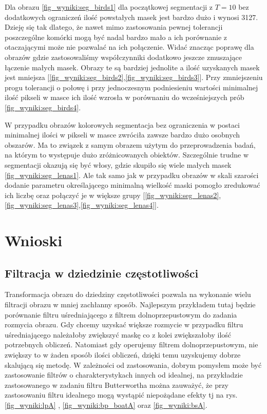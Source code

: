 \documentclass{classrep}
\begin{document}
Dla obrazu \ref{fig_wyniki:seg_birds1} dla początkowej segmentacji z $T=10$ bez dodatkowych ograniczeń ilość powstałych masek jest bardzo dużo i wynosi 3127. Dzieję się tak dlatego, że nawet mimo zastosowania pewnej tolerancji poszczególne komórki mogą być nadal bardzo mało a ich porównanie z otaczającymi może nie pozwalać na ich połączenie. Widać znacząc poprawę dla obrazów gdzie zastosowaliśmy współczynniki dodatkowo jeszcze zmuszające łączenie małych masek. Obrazy te są bardziej jednolite a ilość uzyskanych masek jest mniejsza [\ref{fig_wyniki:seg_birds2},\ref{fig_wyniki:seg_birds3}]. Przy zmniejszeniu progu tolerancji o połowę i przy jednoczesnym podniesieniu wartości minimalnej ilość pikseli w masce ich ilość wzrosła w porównaniu do wcześniejszych prób \ref{fig_wyniki:seg_birds4}.

W przypadku obrazów kolorowych segmentacja bez ograniczenia w postaci minimalnej ilości w pikseli w masce zwróciła zawsze bardzo dużo osobnych obszarów. Ma to związek z samym obrazem użytym do przeprowadzenia badań, na którym to występuje dużo zróżnicowanych obiektów. Szczególnie trudne w segmentacji okazują się być włosy, gdzie skupiło się wiele małych masek \ref{fig_wyniki:seg_lenas1}. Ale tak samo jak w przypadku obrazów w skali szarości dodanie parametru określającego minimalną wielkość maski pomogło zredukować ich liczbę oraz połączyć je w większe grupy [\ref{fig_wyniki:seg_lenas2},\ref{fig_wyniki:seg_lenas3},\ref{fig_wyniki:seg_lenas4}].

\section{Wnioski}

\subsection{Filtracja w dziedzinie częstotliwości}

Transformacja obrazu do dziedziny częstotliwości pozwala na wykonanie wielu filtracji obrazu w mniej zachłanny sposób. Najlepszym przykładem tutaj będzie porównanie filtru uśredniającego z filtrem dolnoprzepustowym do zadania rozmycia obrazu. Gdy chcemy uzyskać większe rozmycie w przypadku filtru uśredniającego należałoby zwiększyć maskę co z kolei zwiększałoby ilość potrzebnych obliczeń. Natomiast gdy operujemy filtrem dolnoprzepustowym, nie zwiększy to w żaden sposób ilości obliczeń, dzięki temu uzyskujemy dobrze skalującą się metodę. W zależności od zastosowania, dobrym pomysłem może być zastosowanie filtrów o charakterystykach innych od idealnej, na przykładzie zastosowanego w zadaniu filtru Butterwortha można zauważyć, że przy zastosowaniu filtru idealnego mogą wystąpić niepożądane efekty tj na rys. \ref{fig_wyniki:lpA} , \ref{fig_wyniki:bp_boatA} oraz \ref{fig_wyniki:bsA}. 
\end{document}
